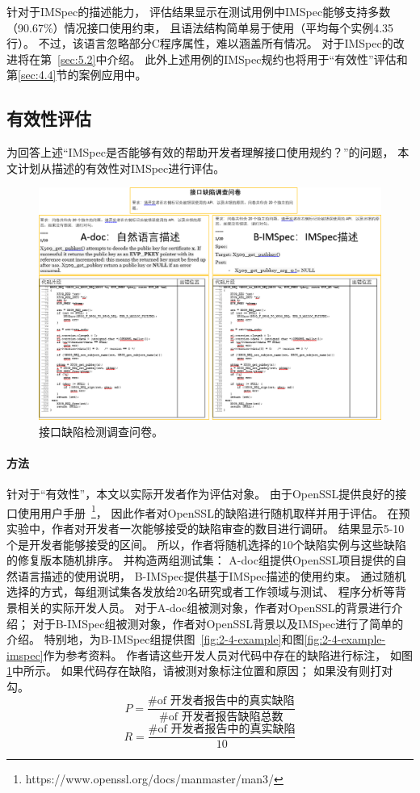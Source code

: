 针对于IMSpec的描述能力，
评估结果显示在测试用例中IMSpec能够支持多数（90.67\%）情况接口使用约束，
且语法结构简单易于使用（平均每个实例4.35行）。
不过，该语言忽略部分C程序属性，难以涵盖所有情况。
对于IMSpec的改进将在第~\ref{sec:5.2}中介绍。
此外上述用例的IMSpec规约也将用于“有效性”评估和第\ref{sec:4.4}节的案例应用中。


\subsection{有效性评估}
为回答上述“IMSpec是否能够有效的帮助开发者理解接口使用规约？”的问题，
本文计划从描述的有效性对IMSpec进行评估。

\begin{figure}[b]
	\centering
	\includegraphics[width=0.85\linewidth]{figures/cp2-survey.png}
	\caption{
		接口缺陷检测调查问卷。
	}
	\label{fig:2-5-survey}
\end{figure}

\paragraph{方法}
针对于“有效性”，本文以实际开发者作为评估对象。
由于OpenSSL提供良好的接口使用用户手册~\footnote{https://www.openssl.org/docs/manmaster/man3/}，
因此作者对OpenSSL的缺陷进行随机取样并用于评估。
在预实验中，作者对开发者一次能够接受的缺陷审查的数目进行调研。
结果显示5-10个是开发者能够接受的区间。
所以，作者将随机选择的10个缺陷实例与这些缺陷的修复版本随机排序。
并构造两组测试集：
A-doc组提供OpenSSL项目提供的自然语言描述的使用说明，
B-IMSpec提供基于IMSpec描述的使用约束。
通过随机选择的方式，每组测试集各发放给20名研究或者工作领域与测试、
程序分析等背景相关的实际开发人员。
对于A-doc组被测对象，作者对OpenSSL的背景进行介绍；
对于B-IMSpec组被测对象，作者对OpenSSL背景以及IMSpec进行了简单的介绍。
特别地，为B-IMSpec组提供图~\ref{fig:2-4-example}和图\ref{fig:2-4-example-imspec}作为参考资料。
作者请这些开发人员对代码中存在的缺陷进行标注，
如图\ref{fig:2-5-survey}中所示。
如果代码存在缺陷，请被测对象标注位置和原因；
如果没有则打对勾。
\begin{equation}
\label{eq:p}
P = \dfrac{\text{\# of 开发者报告中的真实缺陷}}{\text{\# of 开发者报告缺陷总数}}
\end{equation}
\begin{equation}
\label{eq:r}
R = \dfrac{\text{\# of 开发者报告中的真实缺陷}}{10}
\end{equation}


